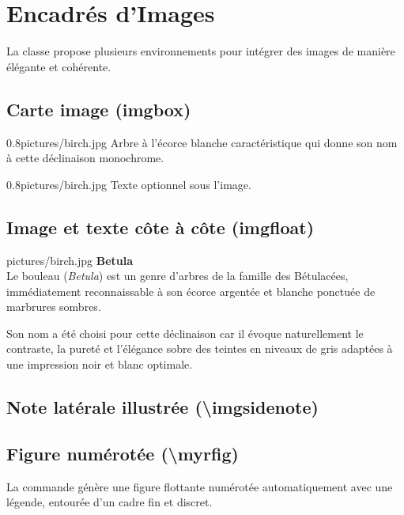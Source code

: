 \documentclass[theme=betula]{myrtille}
\begin{document}
\section{Encadrés d'Images}
La classe propose plusieurs environnements pour intégrer des images de manière élégante et cohérente.

\subsection{Carte image (imgbox)}
\begin{imgbox}{0.8\linewidth}{pictures/birch.jpg}
    Arbre à l'écorce blanche caractéristique qui donne son nom à cette déclinaison monochrome.
\end{imgbox}

\begin{texblock}
\begin{imgbox}{0.8\linewidth}{pictures/birch.jpg}
Texte optionnel sous l'image.
\end{imgbox}
\end{texblock}

\subsection{Image et texte côte à côte (imgfloat)}
\begin{imgfloat}{pictures/birch.jpg}
\textbf{Betula}\\[4pt]
Le bouleau (\textit{Betula}) est un genre d'arbres de la famille des Bétulacées, immédiatement reconnaissable à son écorce argentée et blanche ponctuée de marbrures sombres.

Son nom a été choisi pour cette déclinaison car il évoque naturellement le contraste, la pureté et l'élégance sobre des teintes en niveaux de gris adaptées à une impression noir et blanc optimale.
\end{imgfloat}

\subsection{Note latérale illustrée (\textbackslash imgsidenote)}

\subsection{Figure numérotée (\textbackslash myrfig)}
La commande  génère une figure flottante numérotée automatiquement avec une légende, entourée d'un cadre fin et discret.
\end{document}
